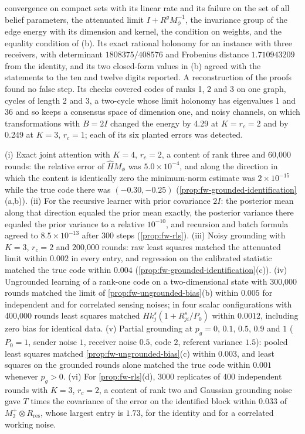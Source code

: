 \begin{numcheck}
convergence on compact sets with its linear rate and its failure on the set of all belief parameters, the attenuated limit $I+R^gM_\phi^{-1}$, the invariance group of the edge energy with its dimension and kernel, the condition on weights, and the equality condition of (b). Its exact rational holonomy for an instance with three receivers, with determinant $1808375/408576$ and Frobenius distance $1.710943209$ from the identity, and its two closed-form values in (b) agreed with the statements to the ten and twelve digits reported. A reconstruction of the proofs found no false step. Its checks covered codes of ranks 1, 2 and 3 on one graph, cycles of length 2 and 3, a two-cycle whose limit holonomy has eigenvalues 1 and 36 and so keeps a consensus space of dimension one, and noisy channels, on which transformations with $B=2I$ changed the energy by 4.29 at $K=r_c=2$ and by 0.249 at $K=3$, $r_c=1$; each of its six planted errors was detected.
\end{numcheck}

\begin{numcheck}\label{chk:fw-learning}
(i) Exact joint attention with $K=4$, $r_c=2$, a content of rank three and 60{,}000 rounds: the relative error of $\hat HM_\phi$ was $5.0\times10^{-4}$, and along the direction in which the content is identically zero the minimum-norm estimate was $2\times10^{-15}$ while the true code there was $(-0.30,-0.25)$ (\cref{prop:fw-grounded-identification}(a,b)). (ii) For the recursive learner with prior covariance $2I$: the posterior mean along that direction equaled the prior mean exactly, the posterior variance there equaled the prior variance to a relative $10^{-10}$, and recursion and batch formula agreed to $8.5\times10^{-13}$ after 300 steps (\cref{prop:fw-rls}). (iii) Noisy grounding with $K=3$, $r_c=2$ and 200{,}000 rounds: raw least squares matched the attenuated limit within $0.002$ in every entry, and regression on the calibrated statistic matched the true code within $0.004$ (\cref{prop:fw-grounded-identification}(c)). (iv) Ungrounded learning of a rank-one code on a two-dimensional state with 300{,}000 rounds matched the limit of \cref{prop:fw-ungrounded-bias}(b) within $0.005$ for independent and for correlated sensing noises; in four scalar configurations with 400{,}000 rounds least squares matched $Hk^s_j(1+R^s_{ji}/P_0)$ within $0.0012$, including zero bias for identical data. (v) Partial grounding at $p_g=0$, $0.1$, $0.5$, $0.9$ and $1$ ($P_0=1$, sender noise $1$, receiver noise $0.5$, code $2$, referent variance $1.5$): pooled least squares matched \cref{prop:fw-ungrounded-bias}(c) within $0.003$, and least squares on the grounded rounds alone matched the true code within $0.001$ whenever $p_g>0$. (vi) For \cref{prop:fw-rls}(d), 3000 replicates of 400 independent rounds with $K=3$, $r_c=2$, a content of rank two and Gaussian grounding noise gave $T$ times the covariance of the error on the identified block within $0.033$ of $M_2^+\otimes R_{\mathrm{res}}$, whose largest entry is $1.73$, for the identity and for a correlated working noise.
\end{numcheck}

